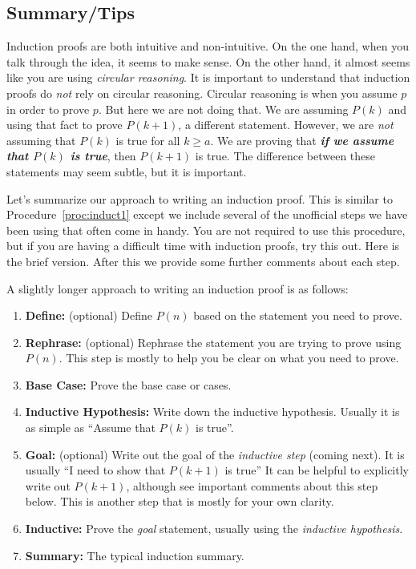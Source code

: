 \subsection{Summary/Tips}

Induction proofs are both intuitive and non-intuitive.  On the one hand, when you talk through
the idea, it seems to make sense.  On the other hand, it almost seems like you are using
{\em circular reasoning}.  It is important to understand that induction proofs do {\em not}
rely on circular reasoning.  Circular reasoning is when you assume $p$ in order to prove $p$.
But here we are not doing that.  We are assuming $P(k)$ and using that fact to prove $P(k+1)$, 
a different statement.  However, we are {\em not} assuming that $P(k)$ is true for all $k\geq a$.  
We are proving that {\bf\em if we assume that $P(k)$ is true}, then $P(k+1)$ is true.  
The difference between these statements may seem subtle, but it is important.

Let's summarize our approach to writing an induction proof.  
This is similar to Procedure~\ref{proc:induct1} except we include several of the unofficial steps
we have been using that often come in handy.
You are not required to use this procedure, but if you are having a difficult time with
induction proofs, try this out.  Here is the brief version.  After this we provide some
further comments about each step.

\newpage %

\begin{proc}\label{proc:induct2}
A slightly longer approach to writing an induction proof is as follows:
\begin{enumerate}
\item{\bf Define:} (optional) 
Define $P(n)$ based on the statement you need to prove.
\item{\bf Rephrase:}  (optional)
Rephrase the statement you are trying to prove using $P(n)$. 
This step is mostly to help you be clear on what you need to prove.
\item{\bf Base Case:} 
Prove the base case or cases.
\item{\bf Inductive Hypothesis:} 
Write down the inductive hypothesis. Usually it is as simple as ``Assume that $P(k)$ is true''.
\item{\bf Goal:} (optional)
Write out the goal of the {\em inductive step} (coming next).
It is usually ``I need to show that $P(k+1)$ is true''
It can be helpful to explicitly write out $P(k+1)$, although see important comments
about this step below.
This is another step that is mostly for your own clarity.
\item{\bf Inductive:} Prove the {\em goal} statement, usually using the 
{\em inductive hypothesis}.
\item{\bf Summary:} The typical induction summary.
\end{enumerate}
\end{proc}


